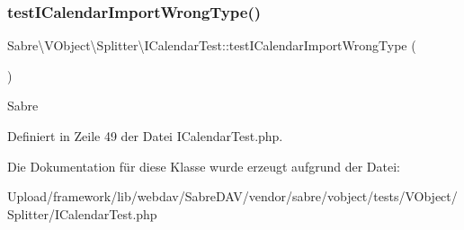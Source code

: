 \mbox{\label{class_sabre_1_1_v_object_1_1_splitter_1_1_i_calendar_test_ae11c5f92f17dd71b4dd9a65f58c1a9e1}} 
\subsubsection{\texorpdfstring{test\+I\+Calendar\+Import\+Wrong\+Type()}{testICalendarImportWrongType()}}
{\footnotesize\ttfamily Sabre\textbackslash{}\+V\+Object\textbackslash{}\+Splitter\textbackslash{}\+I\+Calendar\+Test\+::test\+I\+Calendar\+Import\+Wrong\+Type (\begin{DoxyParamCaption}{ }\end{DoxyParamCaption})}

Sabre 

Definiert in Zeile 49 der Datei I\+Calendar\+Test.\+php.



Die Dokumentation für diese Klasse wurde erzeugt aufgrund der Datei\+:\begin{DoxyCompactItemize}
\item 
Upload/framework/lib/webdav/\+Sabre\+D\+A\+V/vendor/sabre/vobject/tests/\+V\+Object/\+Splitter/I\+Calendar\+Test.\+php\end{DoxyCompactItemize}
